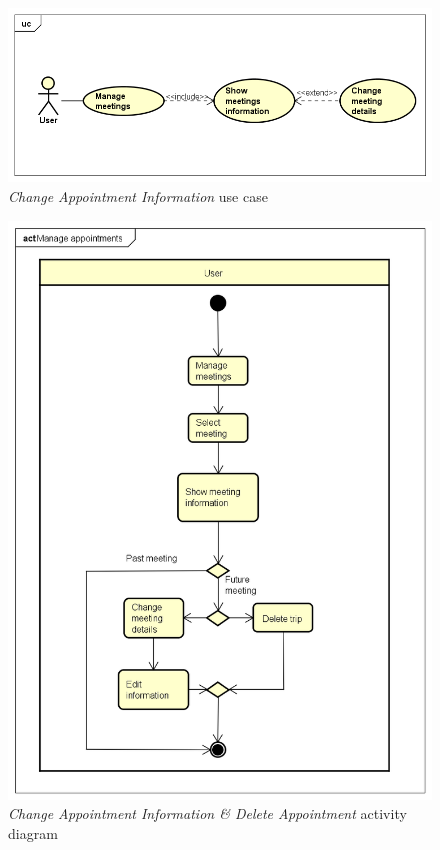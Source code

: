 \begin{figure}[h]
	\includegraphics[width=\textwidth]{Img/ChangeAppointmentInformationUC}
	\caption{\emph{Change Appointment Information} use case}
	\label{fig:ChangeAppointmentInformationUC}
\end{figure}

\begin{figure}[h]
\centering
	\includegraphics[width=\textheight, height=\textwidth, keepaspectratio=true]{Img/ManageAppointmentsAC}
	\caption{\emph{Change Appointment Information \& Delete Appointment} activity diagram}
	\label{fig:ManageAppointmentsAC}
\end{figure}

